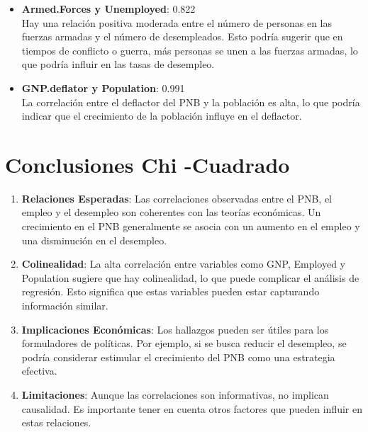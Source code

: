 \documentclass{article}
\begin{document}
\begin{itemize}
    \item \textbf{Armed.Forces y Unemployed}: 0.822\\
    Hay una relación positiva moderada entre el número de personas en las fuerzas armadas y el número de desempleados. Esto podría sugerir que en tiempos de conflicto o guerra, más personas se unen a las fuerzas armadas, lo que podría influir en las tasas de desempleo.
    
    \item \textbf{GNP.deflator y Population}: 0.991\\
    La correlación entre el deflactor del PNB y la población es alta, lo que podría indicar que el crecimiento de la población influye en el deflactor.
\end{itemize}

\section{Conclusiones Chi -Cuadrado}

\begin{enumerate}
    \item \textbf{Relaciones Esperadas}: Las correlaciones observadas entre el PNB, el empleo y el desempleo son coherentes con las teorías económicas. Un crecimiento en el PNB generalmente se asocia con un aumento en el empleo y una disminución en el desempleo.
    
    \item \textbf{Colinealidad}: La alta correlación entre variables como GNP, Employed y Population sugiere que hay colinealidad, lo que puede complicar el análisis de regresión. Esto significa que estas variables pueden estar capturando información similar.
    
    \item \textbf{Implicaciones Económicas}: Los hallazgos pueden ser útiles para los formuladores de políticas. Por ejemplo, si se busca reducir el desempleo, se podría considerar estimular el crecimiento del PNB como una estrategia efectiva.
    
    \item \textbf{Limitaciones}: Aunque las correlaciones son informativas, no implican causalidad. Es importante tener en cuenta otros factores que pueden influir en estas relaciones.
\end{enumerate}
\end{document}
